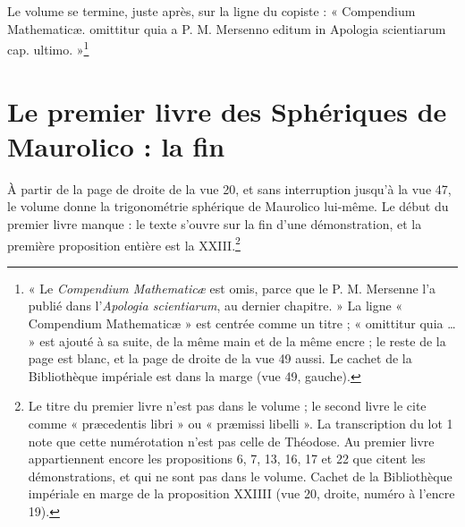 \documentclass[11pt,a4paper]{article}
\begin{document}
Le volume se termine, juste après, sur la ligne du copiste : « Compendium
Mathematicæ. omittitur quia a P. M. Mersenno editum in Apologia scientiarum
cap. ultimo. »\footnote{« Le \emph{Compendium Mathematicæ} est omis, parce que
le P. M. Mersenne l'a publié dans l'\emph{Apologia scientiarum}, au dernier
chapitre. » La ligne « Compendium Mathematicæ » est centrée comme un titre ;
« omittitur quia … » est ajouté à sa suite, de la même main et de la même encre ;
le reste de la page est blanc, et la page de droite de la vue 49 aussi. Le cachet
de la Bibliothèque impériale est dans la marge (vue 49, gauche).}

\section*{Le premier livre des Sphériques de Maurolico : la fin}

À partir de la page de droite de la vue 20, et sans interruption jusqu'à la
vue 47, le volume donne la trigonométrie sphérique de Maurolico lui-même. Le
début du premier livre manque : le texte s'ouvre sur la fin d'une démonstration,
et la première proposition entière est la XXIII.\footnote{Le titre du premier
livre n'est pas dans le volume ; le second livre le cite comme « præcedentis
libri » ou « præmissi libelli ». La transcription du lot 1 note que cette
numérotation n'est pas celle de Théodose. Au premier livre appartiennent
encore les propositions 6, 7, 13, 16, 17 et 22 que citent les démonstrations,
et qui ne sont pas dans le volume. Cachet de la Bibliothèque impériale en marge
de la proposition XXIIII (vue 20, droite, numéro à l'encre 19).}
\end{document}
